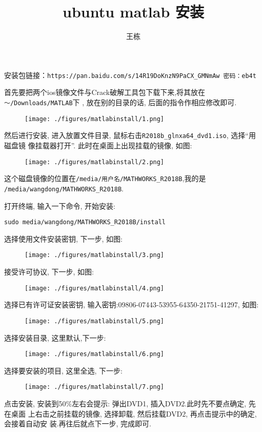 \documentclass{article}
\begin{document}
\title{ubuntu matlab 安装}
\author{王栋}
\date{\chntoday}
\maketitle
安装包链接：\verb+https://pan.baidu.com/s/14R19DoKnzN9PaCX_GMNmAw 密码：eb4t+

首先要把两个ios镜像文件与Crack破解工具包下载下来,将其放在\verb+～/Downloads/MATLAB+下
, 放在别的目录的话, 后面的指令作相应修改即可.
\begin{figure}[H]
    \centering
    \texttt{[image: ./figures/matlabinstall/1.png]}
\end{figure}

然后进行安装, 进入放置文件目录, 鼠标右击\verb+R2018b_glnxa64_dvd1.iso+, 选择“用磁盘镜
像挂载器打开”. 此时在桌面上出现挂载的镜像, 如图:
\begin{figure}[H]
    \centering
    \texttt{[image: ./figures/matlabinstall/2.png]}
\end{figure}

这个磁盘镜像的位置在\verb+/media/用户名/MATHWORKS_R2018B+,我的是
\verb+/media/wangdong/MATHWORKS_R2018B+.

打开终端, 输入一下命令, 开始安装:

\verb+sudo media/wangdong/MATHWORKS_R2018B/install+

选择使用文件安装密钥, 下一步, 如图:
\begin{figure}[H]
    \centering
    \texttt{[image: ./figures/matlabinstall/3.png]}
\end{figure}
接受许可协议, 下一步, 如图:
\begin{figure}[H]
    \centering
    \texttt{[image: ./figures/matlabinstall/4.png]}
\end{figure}
选择已有许可证安装密钥, 输入密钥:09806-07443-53955-64350-21751-41297, 如图:
\begin{figure}[H]
    \centering
    \texttt{[image: ./figures/matlabinstall/5.png]}
\end{figure}
选择安装目录, 这里默认,下一步:
\begin{figure}[H]
    \centering
    \texttt{[image: ./figures/matlabinstall/6.png]}
\end{figure}
选择要安装的项目, 这里全选, 下一步:
\begin{figure}[H]
    \centering
    \texttt{[image: ./figures/matlabinstall/7.png]}
\end{figure}
点击安装, 安装到50$\%$左右会提示: 弹出DVD1, 插入DVD2.此时先不要点确定, 先在桌面
上右击之前挂载的镜像, 选择卸载, 然后挂载DVD2, 再点击提示中的确定, 会接着自动安
装.再往后就点下一步, 完成即可.
\end{document}
